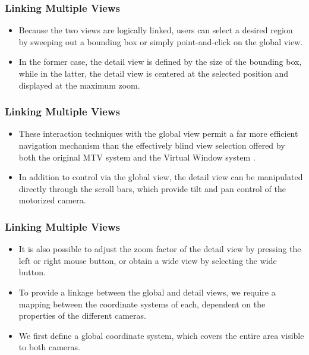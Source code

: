 \documentclass{beamer}
\begin{document}
\begin{frame}
\frametitle{Linking Multiple Views}

\begin{itemize}
\item Because the two views are logically linked, users can select a desired region by sweeping out a bounding box or simply point-and-click on the global view.
\item In the former case, the detail view is defined by the size of the bounding box, while in the latter, the detail view is centered at the selected position and displayed at the maximum zoom.
\end{itemize}

\end{frame}

\begin{frame}
\frametitle{Linking Multiple Views}

\begin{itemize}
\item These interaction techniques with the global view permit a far more efficient navigation mechanism than the effectively blind view selection offered by both the original MTV system  and the Virtual Window system .
\item In addition to control via the global view, the detail view can be manipulated directly through the scroll bars, which provide tilt and pan control of the motorized camera.
\end{itemize}

\end{frame}

\begin{frame}
\frametitle{Linking Multiple Views}

\begin{itemize}
\item It is also possible to adjust the zoom factor of the detail view by pressing the left or right mouse button, or obtain a wide view by selecting the wide button.
\item To provide a linkage between the global and detail views, we require a mapping between the coordinate systems of each, dependent on the properties of the different cameras.
\item We first define a global coordinate system, which covers the entire area visible to both cameras.
\end{itemize}

\end{frame}
\end{document}
